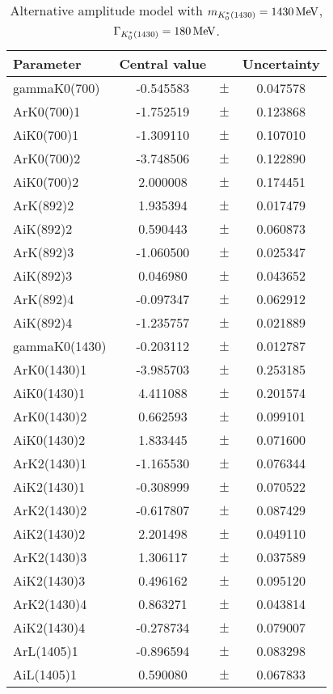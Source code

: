 \clearpage

\begin{table}
\centering
\caption{Alternative amplitude model with $m_{K^*_0(1430)} = 1430 \text{\,Me\kern -0.1em V}$, $\Gamma_{K^*_0(1430)} = 180 \text{\,Me\kern -0.1em V}$.}
\begin{tiny}
\begin{tabular}{lccc}
\toprule
Parameter & Central value & & Uncertainty\\
\midrule
gammaK0(700) & -0.545583 & $\pm$ & 0.047578 \\
ArK0(700)1 & -1.752519 & $\pm$ & 0.123868 \\
AiK0(700)1 & -1.309110 & $\pm$ & 0.107010 \\
ArK0(700)2 & -3.748506 & $\pm$ & 0.122890 \\
AiK0(700)2 & 2.000008 & $\pm$ & 0.174451 \\
ArK(892)2 & 1.935394 & $\pm$ & 0.017479 \\
AiK(892)2 & 0.590443 & $\pm$ & 0.060873 \\
ArK(892)3 & -1.060500 & $\pm$ & 0.025347 \\
AiK(892)3 & 0.046980 & $\pm$ & 0.043652 \\
ArK(892)4 & -0.097347 & $\pm$ & 0.062912 \\
AiK(892)4 & -1.235757 & $\pm$ & 0.021889 \\
gammaK0(1430) & -0.203112 & $\pm$ & 0.012787 \\
ArK0(1430)1 & -3.985703 & $\pm$ & 0.253185 \\
AiK0(1430)1 & 4.411088 & $\pm$ & 0.201574 \\
ArK0(1430)2 & 0.662593 & $\pm$ & 0.099101 \\
AiK0(1430)2 & 1.833445 & $\pm$ & 0.071600 \\
ArK2(1430)1 & -1.165530 & $\pm$ & 0.076344 \\
AiK2(1430)1 & -0.308999 & $\pm$ & 0.070522 \\
ArK2(1430)2 & -0.617807 & $\pm$ & 0.087429 \\
AiK2(1430)2 & 2.201498 & $\pm$ & 0.049110 \\
ArK2(1430)3 & 1.306117 & $\pm$ & 0.037589 \\
AiK2(1430)3 & 0.496162 & $\pm$ & 0.095120 \\
ArK2(1430)4 & 0.863271 & $\pm$ & 0.043814 \\
AiK2(1430)4 & -0.278734 & $\pm$ & 0.079007 \\
ArL(1405)1 & -0.896594 & $\pm$ & 0.083298 \\
AiL(1405)1 & 0.590080 & $\pm$ & 0.067833 \\

\end{tabular}
\end{tiny}
\end{table}
